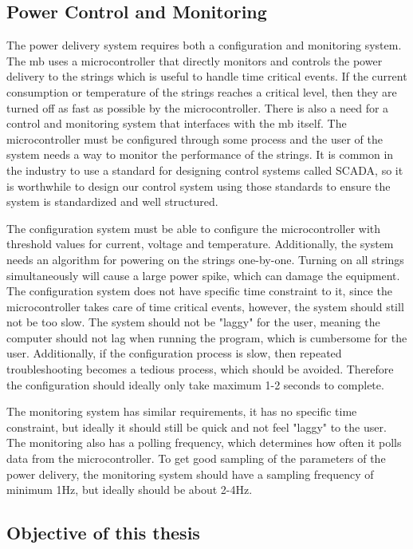 \documentclass[main.tex]{subfiles}
\begin{document}
\subsection{Power Control and Monitoring}

The power delivery system requires both a configuration and monitoring system. The \gls{mb} uses a microcontroller that directly monitors and controls the power delivery to the strings which is useful to handle time critical events. If the current consumption or temperature of the strings reaches a critical level, then they are turned off as fast as possible by the microcontroller. There is also a need for a control and monitoring system that interfaces with the \gls{mb} itself. The microcontroller must be configured through some process and the user of the system needs a way to monitor the performance of the strings. It is common in the industry to use a standard for designing control systems called SCADA, so it is worthwhile to design our control system using those standards to ensure the system is standardized and well structured.

The configuration system must be able to configure the microcontroller with threshold values for current, voltage and temperature. Additionally, the system needs an algorithm for powering on the strings one-by-one. Turning on all strings simultaneously will cause a large power spike, which can damage the equipment. The configuration system does not have specific time constraint to it, since the microcontroller takes care of time critical events, however, the system should still not be too slow. The system should not be "laggy" for the user, meaning the computer should not lag when running the program, which is cumbersome for the user. Additionally, if the configuration process is slow, then repeated troubleshooting becomes a tedious process, which should be avoided. Therefore the configuration should ideally only take maximum 1-2 seconds to complete.

The monitoring system has similar requirements, it has no specific time constraint, but ideally it should still be quick and not feel "laggy" to the user. The monitoring also has a polling frequency, which determines how often it polls data from the microcontroller. To get good sampling of the parameters of the power delivery, the monitoring system should have a sampling frequency of minimum 1Hz, but ideally should be about 2-4Hz.

\subsection{Objective of this thesis}
\end{document}
